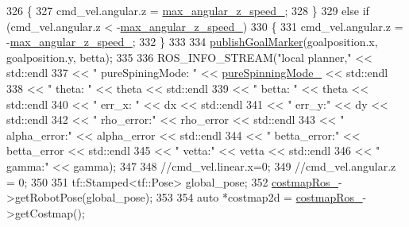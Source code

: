 \begin{DoxyCode}
{326     \{
327         cmd\_vel.angular.z = \hyperlink{classmove__base__z__client_1_1backward__local__planner_1_1BackwardLocalPlanner_a8b5cbc273dfcf1c5e15ac4475b45ca97}{max\_angular\_z\_speed\_};
328     \}
329     \textcolor{keywordflow}{else} \textcolor{keywordflow}{if} (cmd\_vel.angular.z < -\hyperlink{classmove__base__z__client_1_1backward__local__planner_1_1BackwardLocalPlanner_a8b5cbc273dfcf1c5e15ac4475b45ca97}{max\_angular\_z\_speed\_})
330     \{
331         cmd\_vel.angular.z = -\hyperlink{classmove__base__z__client_1_1backward__local__planner_1_1BackwardLocalPlanner_a8b5cbc273dfcf1c5e15ac4475b45ca97}{max\_angular\_z\_speed\_};
332     \}
333 
334     \hyperlink{classmove__base__z__client_1_1backward__local__planner_1_1BackwardLocalPlanner_a691e565d33666d2f7004e791cae29b42}{publishGoalMarker}(goalposition.x, goalposition.y, betta);
335 
336     ROS\_INFO\_STREAM(\textcolor{stringliteral}{"local planner,"} << std::endl
337                                      << \textcolor{stringliteral}{" pureSpiningMode: "} << 
      \hyperlink{classmove__base__z__client_1_1backward__local__planner_1_1BackwardLocalPlanner_abf2b84c0d7a841a7fcec1b93bf5fdd0e}{pureSpinningMode\_} << std::endl
338                                      << \textcolor{stringliteral}{" theta: "} << theta << std::endl
339                                      << \textcolor{stringliteral}{" betta: "} << theta << std::endl
340                                      << \textcolor{stringliteral}{" err\_x: "} << dx << std::endl
341                                      << \textcolor{stringliteral}{" err\_y:"} << dy << std::endl
342                                      << \textcolor{stringliteral}{" rho\_error:"} << rho\_error << std::endl
343                                      << \textcolor{stringliteral}{" alpha\_error:"} << alpha\_error << std::endl
344                                      << \textcolor{stringliteral}{" betta\_error:"} << betta\_error << std::endl
345                                      << \textcolor{stringliteral}{" vetta:"} << vetta << std::endl
346                                      << \textcolor{stringliteral}{" gamma:"} << gamma);
347 
348     \textcolor{comment}{//cmd\_vel.linear.x=0;}
349     \textcolor{comment}{//cmd\_vel.angular.z = 0;}
350 
351     tf::Stamped<tf::Pose> global\_pose;
352     \hyperlink{classmove__base__z__client_1_1backward__local__planner_1_1BackwardLocalPlanner_a865618f84238fe6ff437d1e38ec5fec0}{costmapRos\_}->getRobotPose(global\_pose);
353 
354     \textcolor{keyword}{auto} *costmap2d = \hyperlink{classmove__base__z__client_1_1backward__local__planner_1_1BackwardLocalPlanner_a865618f84238fe6ff437d1e38ec5fec0}{costmapRos\_}->getCostmap();
}
\end{DoxyCode}

